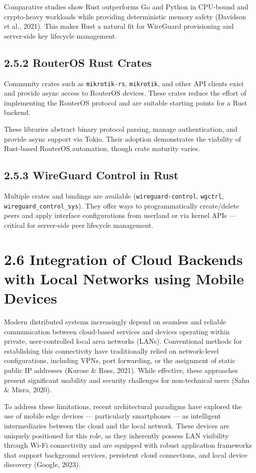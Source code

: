 \documentclass[12pt,a4paper,oneside]{report}
\begin{document}
Comparative studies show Rust outperforms Go and Python in CPU-bound and crypto-heavy workloads while providing deterministic memory safety (Davidson et al., 2021). This makes Rust a natural fit for WireGuard provisioning and server-side key lifecycle management.

\subsection{2.5.2 RouterOS Rust Crates}

Community crates such as \texttt{mikrotik-rs}, \texttt{mikrotik}, and other API clients exist and provide async access to RouterOS devices. These crates reduce the effort of implementing the RouterOS protocol and are suitable starting points for a Rust backend.

These libraries abstract binary protocol parsing, manage authentication, and provide async support via Tokio. Their adoption demonstrates the viability of Rust-based RouterOS automation, though crate maturity varies.

\subsection{2.5.3 WireGuard Control in Rust}

Multiple crates and bindings are available (\texttt{wireguard-control}, \texttt{wgctrl}, \texttt{wireguard\_control\_sys}). They offer ways to programmatically create/delete peers and apply interface configurations from userland or via kernel APIs --- critical for server-side peer lifecycle management.

\section{2.6 Integration of Cloud Backends with Local Networks using Mobile Devices}

Modern distributed systems increasingly depend on seamless and reliable communication between cloud-based services and devices operating within private, user-controlled local area networks (LANs). Conventional methods for establishing this connectivity have traditionally relied on network-level configurations, including VPNs, port forwarding, or the assignment of static public IP addresses (Kurose \& Ross, 2021). While effective, these approaches present significant usability and security challenges for non-technical users (Sahu \& Misra, 2020).

To address these limitations, recent architectural paradigms have explored the use of mobile edge devices --- particularly smartphones --- as intelligent intermediaries between the cloud and the local network. These devices are uniquely positioned for this role, as they inherently possess LAN visibility through Wi-Fi connectivity and are equipped with robust application frameworks that support background services, persistent cloud connections, and local device discovery (Google, 2023).
\end{document}

